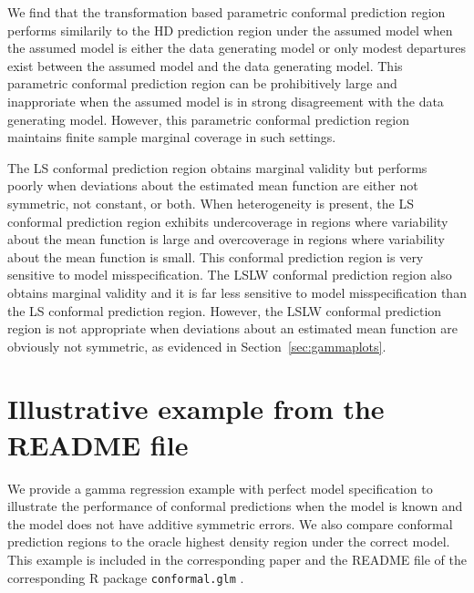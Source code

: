 \documentclass[11pt]{article}\usepackage[]{graphicx}\usepackage[]{color}
\begin{document}
We find that the transformation based parametric conformal prediction region 
performs similarily to the HD prediction region under the assumed model when 
the assumed model is either the data generating model or only modest 
departures exist between the assumed model and the data generating model.  
This parametric conformal prediction region can be prohibitively large and 
inapproriate when the assumed model is in strong disagreement with the data 
generating model.  However, this parametric conformal prediction region 
maintains finite sample marginal coverage in such settings.

The LS conformal prediction region obtains marginal validity 
\citep{lei2018distribution} but performs poorly when deviations about the 
estimated mean function are either not symmetric, not constant, or both.
When heterogeneity is present, the LS conformal prediction region exhibits 
undercoverage in regions where variability about the mean function is large 
and overcoverage in regions where variability about the mean function is 
small.  This conformal prediction region is very sensitive to model 
misspecification.  
The LSLW conformal prediction region also obtains marginal validity 
\citep[Section 5.2]{lei2018distribution} and it is far less sensitive to 
model misspecification than the LS conformal prediction region.  
However, the LSLW conformal prediction region is not appropriate 
when deviations about an estimated mean function are obviously not 
symmetric, as evidenced in Section~\ref{sec:gammaplots}.



\section{Illustrative example from the README file}
\label{sec:README}

We provide a gamma regression example with perfect model specification to 
illustrate the performance of conformal predictions when the model is known 
and the model does not have additive symmetric errors.  We also compare 
conformal prediction regions to the oracle highest density region under 
the correct model. This example is included in the corresponding paper  
\citet{eck2019conformal} and the README file of the corresponding 
R package \texttt{conformal.glm} \citep{eck2018conformalR}.
\end{document}
